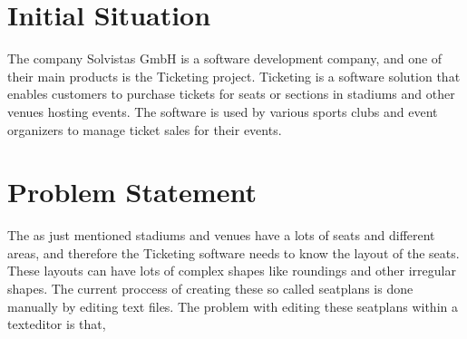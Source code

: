 \section{Initial Situation}
The company Solvistas GmbH is a software development company, and one of their main products is the Ticketing project. Ticketing is a software solution that enables customers to purchase tickets for seats or sections in stadiums and other venues hosting events. The software is used by various sports clubs and event organizers to manage ticket sales for their events.


\section{Problem Statement}
The as just mentioned stadiums and venues have a lots of seats and different areas, and therefore the Ticketing software needs to know the layout of the seats. These layouts can have lots of complex shapes like roundings and other irregular shapes. The current proccess of creating these so called seatplans is done manually by editing text files. The problem with editing these seatplans within a texteditor is that, 